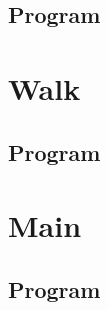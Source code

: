 \documentclass[11pt, a4paper]{article}
\begin{document}
\subsection{Program}

\clearpage
\section{Walk}
\subsection{Program}

\clearpage
\section{Main}
\subsection{Program}

\clearpage

\vspace{1.5cm}
\end{document}
